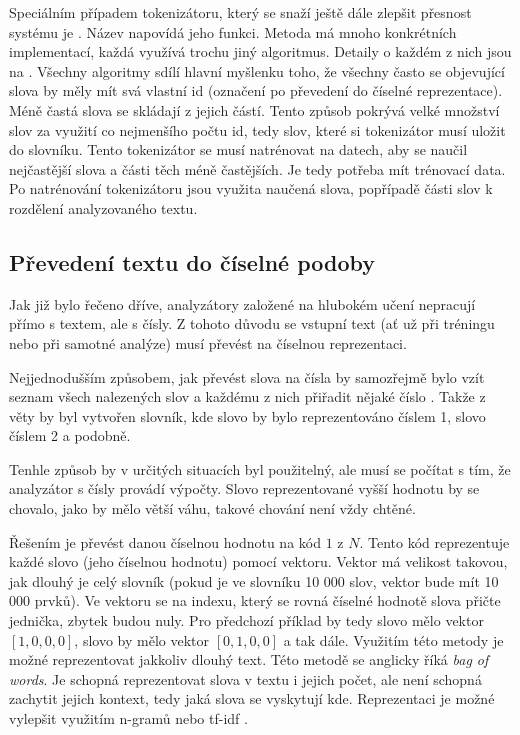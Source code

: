 Speciálním případem tokenizátoru, který se snaží ještě dále zlepšit přesnost systému je \textbf{}. Název napovídá jeho funkci. Metoda má mnoho konkrétních implementací, každá využívá trochu jiný algoritmus. Detaily o každém z nich jsou na \cite{mlexplained}. Všechny algoritmy sdílí hlavní myšlenku toho, že všechny často se objevující slova by měly mít svá vlastní id (označení po převedení do číselné reprezentace). Méně častá slova se skládají z jejich částí. Tento způsob pokrývá velké množství slov za využití co nejmenšího počtu id, tedy slov, které si tokenizátor musí uložit do slovníku. Tento tokenizátor se musí natrénovat na datech, aby se naučil nejčastější slova a části těch méně častějších. Je tedy potřeba mít trénovací data. Po natrénování tokenizátoru jsou využita naučená slova, popřípadě části slov k rozdělení analyzovaného textu. 



\subsection{Převedení textu do číselné podoby}
Jak již bylo řečeno dříve, analyzátory založené na hlubokém učení nepracují přímo s textem, ale s čísly. Z tohoto důvodu se vstupní text (ať už při tréningu nebo při samotné analýze) musí převést na číselnou reprezentaci.

Nejjednodušším způsobem, jak převést slova na čísla by samozřejmě bylo vzít seznam všech nalezených slov a každému z nich přiřadit nějaké číslo \cite{wordtonumber}. Takže z věty  by byl vytvořen slovník, kde slovo  by bylo reprezentováno číslem 1, slovo  číslem 2 a podobně. 


Tenhle způsob by v určitých situacích byl použitelný, ale musí se počítat s tím, že analyzátor s čísly provádí výpočty. Slovo reprezentované vyšší hodnotu by se chovalo, jako by mělo větší váhu, takové chování není vždy chtěné.

Řešením je převést danou číselnou hodnotu na kód $1$ z $N$. Tento kód reprezentuje každé slovo (jeho číselnou hodnotu) pomocí vektoru. Vektor má velikost takovou, jak dlouhý je celý slovník (pokud je ve slovníku 10 000 slov, vektor bude mít 10 000 prvků). Ve vektoru se na indexu, který se rovná číselné hodnotě slova přičte jednička, zbytek budou nuly. Pro předchozí příklad by tedy slovo  mělo vektor $[1,0,0,0]$, slovo  by mělo vektor $[0,1,0,0]$ a tak dále. Využitím této metody je možné reprezentovat jakkoliv dlouhý text. Této metodě se anglicky říká \emph{bag of words}. Je schopná reprezentovat slova v textu i jejich počet, ale není schopná zachytit jejich kontext, tedy jaká slova se vyskytují kde. Reprezentaci je možné vylepšit využitím n-gramů nebo tf-idf \cite{bow}. 
